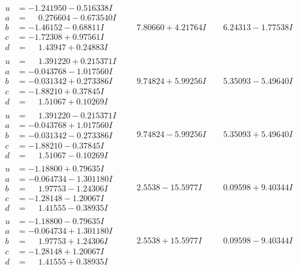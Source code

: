 \documentclass[1p]{elsarticle_modified}
\theoremstyle{definition}
\begin{document}
$$\begin{array}{c|c|c}
\begin{aligned}
u &= -1.241950 - 0.516338 I \\
a &= \phantom{-}0.276604 - 0.673540 I \\
b &= -1.46152 - 0.68811 I \\
c &= -1.72308 + 0.97561 I \\
d &= \phantom{-}1.43947 + 0.24883 I\end{aligned}
 & \phantom{-}7.80660 + 4.21764 I & \phantom{-}6.24313 - 1.77538 I \\ \hline\begin{aligned}
u &= \phantom{-}1.391220 + 0.215371 I \\
a &= -0.043768 - 1.017560 I \\
b &= -0.031342 + 0.273386 I \\
c &= -1.88210 + 0.37845 I \\
d &= \phantom{-}1.51067 + 0.10269 I\end{aligned}
 & \phantom{-}9.74824 + 5.99256 I & \phantom{-}5.35093 - 5.49640 I \\ \hline\begin{aligned}
u &= \phantom{-}1.391220 - 0.215371 I \\
a &= -0.043768 + 1.017560 I \\
b &= -0.031342 - 0.273386 I \\
c &= -1.88210 - 0.37845 I \\
d &= \phantom{-}1.51067 - 0.10269 I\end{aligned}
 & \phantom{-}9.74824 - 5.99256 I & \phantom{-}5.35093 + 5.49640 I \\ \hline\begin{aligned}
u &= -1.18800 + 0.79635 I \\
a &= -0.064734 - 1.301180 I \\
b &= \phantom{-}1.97753 - 1.24306 I \\
c &= -1.28148 - 1.20067 I \\
d &= \phantom{-}1.41555 - 0.38935 I\end{aligned}
 & \phantom{-}2.5538 - 15.5977 I & \phantom{-}0.09598 + 9.40344 I \\ \hline\begin{aligned}
u &= -1.18800 - 0.79635 I \\
a &= -0.064734 + 1.301180 I \\
b &= \phantom{-}1.97753 + 1.24306 I \\
c &= -1.28148 + 1.20067 I \\
d &= \phantom{-}1.41555 + 0.38935 I\end{aligned}
 & \phantom{-}2.5538 + 15.5977 I & \phantom{-}0.09598 - 9.40344 I\\

\end{array}$$
\end{document}
